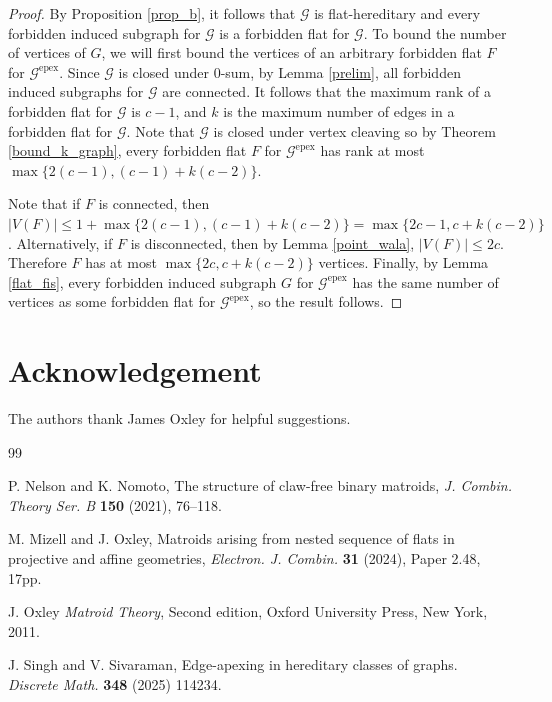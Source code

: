 \documentclass[11pt]{amsart}
\theoremstyle{definition}
\theoremstyle{remark}
\numberwithin{equation}{section}
\newcommand\Ga{\mathcal{G}^\mathrm{epex}}
\begin{document}
\begin{proof}
By Proposition \ref{prop_b}, it follows that $\mathcal{G}$ is flat-hereditary and every forbidden induced subgraph for $\mathcal{G}$ is a forbidden flat for $\mathcal{G}$. To bound the number of vertices of $G$, we will first bound the vertices of an arbitrary forbidden flat $F$ for $\Ga$. Since $\mathcal{G}$ is closed under $0$-sum, by Lemma \ref{prelim}, all forbidden induced subgraphs for $\mathcal{G}$ are connected. It follows that the maximum rank of a forbidden flat for $\mathcal{G}$ is $c-1$, and $k$ is the maximum number of edges in a forbidden flat for $\mathcal{G}$. Note that $\mathcal{G}$ is closed under vertex cleaving so by Theorem \ref{bound_k_graph}, every forbidden flat $F$ for $\Ga$ has rank at most $\max \{2(c-1), (c-1) + k(c-2)\}$.

Note that if $F$ is connected, then $|V(F)| \leq 1+ \max \{2(c-1), (c-1) + k(c-2)\} = \max \{2c-1, c + k(c-2)\}$. Alternatively, if $F$ is disconnected, then by Lemma \ref{point_wala}, $|V(F)| \leq 2c$. Therefore $F$ has at most $\max \{2c, c + k(c-2)\}$ vertices. Finally, by Lemma \ref{flat_fis}, every forbidden induced subgraph $G$ for $\Ga$ has the same number of vertices as some forbidden flat for $\Ga$, so the result follows.
\end{proof}









\section*{Acknowledgement}

The authors thank James Oxley for helpful suggestions. 


\begin{thebibliography}{99}



 P. Nelson and K. Nomoto, The structure of claw-free binary matroids, {\em J. Combin. Theory Ser. B} \textbf{150} (2021), 76--118.


 M. Mizell and J. Oxley, Matroids arising from nested sequence of flats in projective and affine geometries, {\em Electron. J. Combin.}  \textbf{31} (2024), Paper 2.48, 17pp.


 J. Oxley {\em Matroid Theory}, Second edition, Oxford University Press, New York, 2011.


 J. Singh and V. Sivaraman, Edge-apexing in hereditary classes of graphs. {\em Discrete Math.} \textbf{348} (2025) 114234.






\end{thebibliography}
\end{document}
